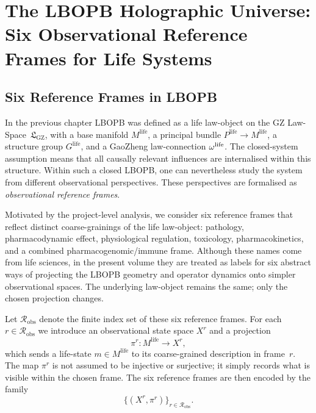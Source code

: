 \documentclass[11pt]{book}
\theoremstyle{plain}
\theoremstyle{definition}
\theoremstyle{remark}
\newcommand{\GZLS}{\ensuremath{\mathfrak{L}_{\mathrm{GZ}}}}       \newcommand{\GZLT}{\ensuremath{M_{!w}}}                           \newcommand{\GZLOC}{\ensuremath{A_M}}                             \newcommand{\GZLCurv}{\ensuremath{\mathcal{F}_{\mathrm{law}}}}
\begin{document}
\chapter[The LBOPB Holographic Universe and Six Reference Frames]{The LBOPB Holographic Universe:\\
         Six Observational Reference Frames for Life Systems}


\section{Six Reference Frames in LBOPB}


In the previous chapter LBOPB was defined as a life law-object on the
GZ Law-Space~$\GZLS$, with a base manifold $M^{\mathrm{life}}$, a
principal bundle $P^{\mathrm{life}} \to M^{\mathrm{life}}$, a
structure group $G^{\mathrm{life}}$, and a GaoZheng law-connection
$\omega^{\mathrm{life}}$. The closed-system assumption means that all
causally relevant influences are internalised within this structure.
Within such a closed LBOPB, one can nevertheless study the system from
different observational perspectives. These perspectives are formalised
as \emph{observational reference frames}.

Motivated by the project-level analysis, we consider six reference
frames that reflect distinct coarse-grainings of the life law-object:
pathology, pharmacodynamic effect, physiological regulation,
toxicology, pharmacokinetics, and a combined pharmacogenomic/immune
frame. Although these names come from life sciences, in the present
volume they are treated as labels for six abstract ways of projecting
the LBOPB geometry and operator dynamics onto simpler observational
spaces. The underlying law-object remains the same; only the chosen
projection changes.

Let $\mathcal{R}_{\mathrm{obs}}$ denote the finite index set of these
six reference frames. For each $r \in \mathcal{R}_{\mathrm{obs}}$ we
introduce an observational state space $X^{r}$ and a projection
\[
  \pi^{r} \colon M^{\mathrm{life}} \longrightarrow X^{r},
\]
which sends a life-state $m \in M^{\mathrm{life}}$ to its
coarse-grained description in frame~$r$. The map $\pi^{r}$ is not
assumed to be injective or surjective; it simply records what is
visible within the chosen frame. The six reference frames are then
encoded by the family
\[
  \bigl\{ (X^{r}, \pi^{r}) \bigr\}_{r \in \mathcal{R}_{\mathrm{obs}}}.
\]
\end{document}
